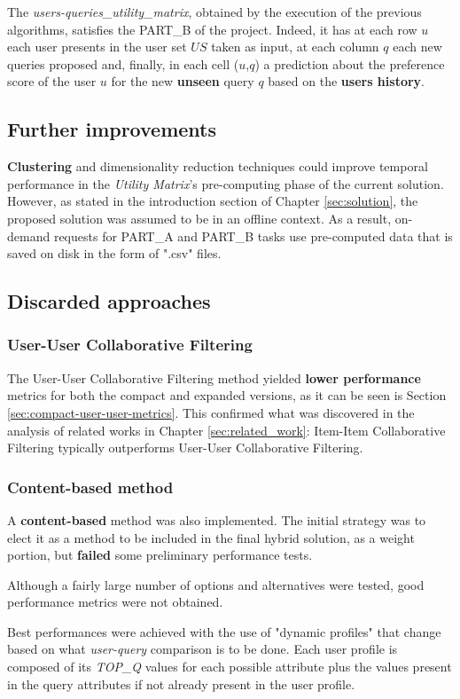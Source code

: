 The \textit{users-queries\_utility\_matrix}, obtained by the execution of the previous algorithms, satisfies the PART\_B of the project. Indeed, it has at each row $u$ each user presents in the user set $US$ taken as input, at each column $q$ each new queries proposed and, finally, in each cell ($u$,$q$) a prediction about the preference score of the user $u$ for the new \textbf{unseen} query $q$ based on the \textbf{users history}.





\subsection{Further improvements}

\textbf{Clustering} and dimensionality reduction techniques could improve temporal performance in the \textit{Utility Matrix}'s pre-computing phase of the current solution.
However, as stated in the introduction section of Chapter \ref{sec:solution}, the proposed solution was assumed to be in an offline context. As a result, on-demand requests for PART\_A and PART\_B tasks use pre-computed data that is saved on disk in the form of ".csv" files.

\subsection{Discarded approaches}

\subsubsection{User-User Collaborative Filtering}
The User-User Collaborative Filtering method yielded \textbf{lower performance} metrics for both the compact and expanded versions, as it can be seen is Section \ref{sec:compact-user-user-metrics}. This confirmed what was discovered in the analysis of related works in Chapter \ref{sec:related_work}: Item-Item Collaborative Filtering typically outperforms User-User Collaborative Filtering.

\subsubsection{Content-based method}

A \textbf{content-based} method was also implemented.
The initial strategy was to elect it as a method to be included in the final hybrid solution, as a weight portion, but \textbf{failed} some preliminary performance tests.

Although a fairly large number of options and alternatives were tested, good performance metrics were not obtained.

Best performances were achieved with the use of "dynamic profiles" that change based on what \textit{user-query} comparison is to be done.
Each user profile is composed of its \textit{TOP\_Q} values for each possible attribute plus the values present in the query attributes if not already present in the user profile. 




